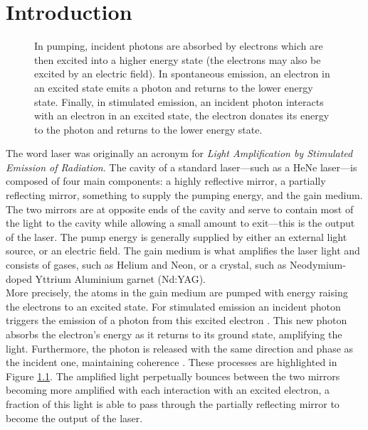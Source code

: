 
\chapter{Introduction}
\begin{figure}[tbp]
\centering

\caption[Comparison of pumping, spontaneous emission, and stimulated emission.]{In pumping, incident photons are absorbed by electrons which are then excited into a higher energy state (the electrons may also be excited by an electric field). In spontaneous emission, an electron in an excited state emits a photon and returns to the lower energy state. Finally, in stimulated emission, an incident photon interacts with an electron in an excited state, the electron donates its energy to the photon and returns to the lower energy state.}
\label{fig:emission}
\end{figure}

The word laser was originally an acronym for \emph{Light Amplification by Stimulated Emission of Radiation}. The cavity of a standard laser---such as a HeNe laser---is composed of four main components: a highly reflective mirror, a partially reflecting mirror, something to supply the pumping energy, and the gain medium. The two mirrors are at opposite ends of the cavity and serve to contain most of the light to the cavity while allowing a small amount to exit---this is the output of the laser. The pump energy is generally supplied by either an external light source, or an electric field. The gain medium is what amplifies the laser light and consists of gases, such as Helium and Neon, or a crystal, such as Neodymium-doped Yttrium Aluminium garnet (Nd:YAG). \\

More precisely, the atoms in the gain medium are pumped with energy raising the electrons to an excited state. For stimulated emission an incident photon triggers the emission of a photon from this excited electron \cite{alazzawi}. This new photon absorbs the electron's energy as it returns to its ground state, amplifying the light. Furthermore, the photon is released with the same direction and phase as the incident one, maintaining coherence \cite{alazzawi}. These processes are highlighted in Figure \ref{fig:emission}. The amplified light perpetually bounces between the two mirrors becoming more amplified with each interaction with an excited electron, a fraction of this light is able to pass through the partially reflecting mirror to become the output of the laser. \\

